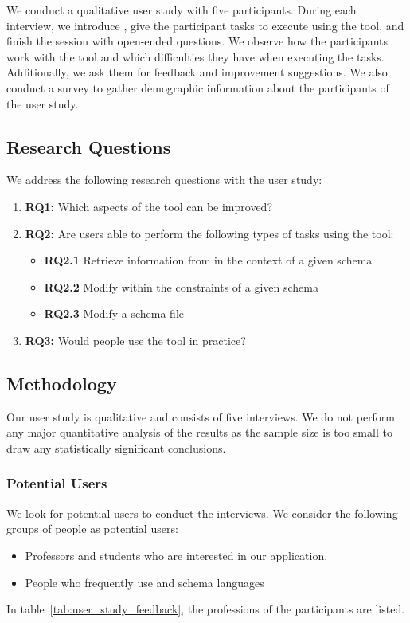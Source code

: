 We conduct a qualitative user study with five participants.
During each interview, we introduce \toolname{}, give the participant tasks to execute using the tool, and finish the session with open-ended questions.
We observe how the participants work with the tool and which difficulties they have when executing the tasks.
Additionally, we ask them for feedback and improvement suggestions.
We also conduct a survey to gather demographic information about the participants of the user study.

\subsection{Research Questions}\label{subsec:research_questions}
We address the following research questions with the user study:
\begin{enumerate}
	\item \textbf{RQ1:} Which aspects of the tool can be improved?
	\item \textbf{RQ2:} Are users able to perform the following types of tasks using the tool:
	 \begin{itemize}
			\item \textbf{RQ2.1} Retrieve information from \cfgfiles{} in the context of a given schema
			\item \textbf{RQ2.2} Modify \cfgfiles{} within the constraints of a given schema
			\item \textbf{RQ2.3} Modify a schema file
		\end{itemize}
	\item \textbf{RQ3:} Would people use the tool in practice?
\end{enumerate}

\subsection{Methodology}\label{subsec:methodology} %

Our user study is qualitative and consists of five interviews.
We do not perform any major quantitative analysis of the results as the sample size is too small to draw any statistically significant conclusions.

\subsubsection{Potential Users}
We look for potential users to conduct the interviews.
We consider the following groups of people as potential users:
\begin{itemize}
    \item Professors and students who are interested in our application.
    \item People who frequently use \cfgfiles{} and schema languages
\end{itemize}
In table~\ref{tab:user_study_feedback}, the professions of the participants are listed.

